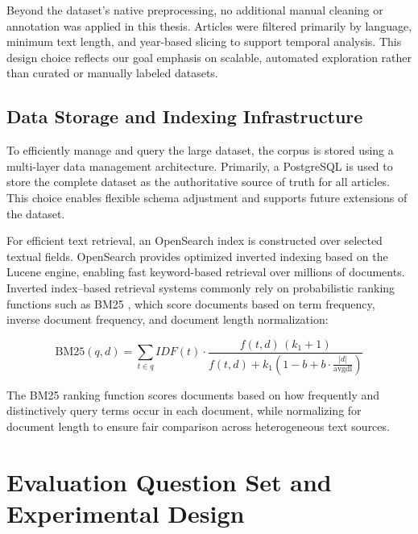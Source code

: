 Beyond the dataset's native preprocessing, no additional manual cleaning or annotation was applied in this thesis. Articles were filtered primarily by language, minimum text length, and year-based slicing to support temporal analysis. This design choice reflects our goal emphasis on scalable, automated exploration rather than curated or manually labeled datasets.

\subsection{Data Storage and Indexing Infrastructure}

To efficiently manage and query the large dataset, the corpus is stored using a multi-layer data management architecture. Primarily, a PostgreSQL is used to store the complete dataset as the authoritative source of truth for all articles. This choice enables flexible schema adjustment and supports future extensions of the dataset.

For efficient text retrieval, an OpenSearch index is constructed over selected textual fields. OpenSearch provides optimized inverted indexing based on the Lucene engine, enabling fast keyword-based retrieval over millions of documents. Inverted index–based retrieval systems commonly rely on probabilistic ranking functions such as BM25 \cite{manning2008ir,robertson2009bm25}, which score documents based on term frequency, inverse document frequency, and document length normalization:

\begin{equation}
    \text{BM25}(q, d) = \sum_{t \in q}
    IDF(t) \cdot
    \frac{f(t,d)\,(k_1 + 1)}
    {f(t,d) + k_1 \left(1 - b + b \cdot \frac{|d|}{\text{avgdl}}\right)}
\end{equation}

The BM25 ranking function scores documents based on how frequently and distinctively query terms occur in each document, while normalizing for document length to ensure fair comparison across heterogeneous text sources.


\section{Evaluation Question Set and Experimental Design}

